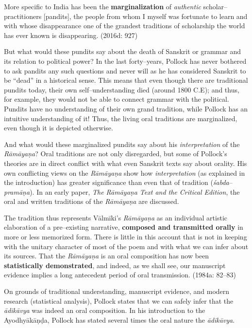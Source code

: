\begin{myquote}
More specific to India has been the \textbf{marginalization} of \textit{authentic} scholar–practitioners [pandits], the people from whom I myself was fortunate to learn and with whose disappearance one of the grandest traditions of scholarship the world has ever known is disappearing. (2016d: 927)
\end{myquote}

But what would these pundits say about the death of Sanskrit or grammar and its relation to political power? In the last forty–years, Pollock has never bothered to ask pandits any such questions and never will as he has considered Sanskrit to be “dead” in a historical sense. This means that even though there are traditional pundits today, their own self–understanding died (around 1800 C.E); and thus, for example, they would not be able to connect grammar with the political. Pundits have no understanding of their own grand tradition, while Pollock has an intuitive understanding of it! Thus, the living oral traditions are marginalized, even though it is depicted otherwise.

And what would these marginalized pundits say about his \textit{interpretation} of the \textit{Rāmāyaṇa}? Oral traditions are not only disregarded, but some of Pollock’s theories are in direct conflict with what even Sanskrit texts say about orality. His own conflicting views on the \textit{Rāmāyaṇa }show how \textit{interpretation }(as explained in the introduction) has greater significance than even that of tradition (\textit{śabda}–\textit{pramāṇa}). In an early paper, \textit{The Rāmāyaṇa Text and the Critical Edition}, the oral and written traditions of the \textit{Rāmāyaṇa} are discussed.

\begin{myquote}
The tradition thus represents Vālmīki’s \textit{Rāmāyaṇa }as an individual artistic elaboration of a pre–existing narrative, \textbf{composed and transmitted orally} in more or less memorized form. There is little in this account that is not in keeping with the unitary character of most of the poem and with what we can infer about its sources. That the \textit{Rāmāyaṇa }is an oral composition has now been \textbf{statistically demonstrated}, and indeed, as we shall see, our manuscript evidence implies a long antecedent period of oral transmission. (1984a: 82–83)
\end{myquote}

On grounds of traditional understanding, manuscript evidence, and modern research (statistical analysis), Pollock states that we can safely infer that the \textit{ādikāvya} was indeed an oral composition. In his introduction to the Ayodhyākāṇḍa, Pollock has stated several times the oral nature the \textit{ādikāvya}.

